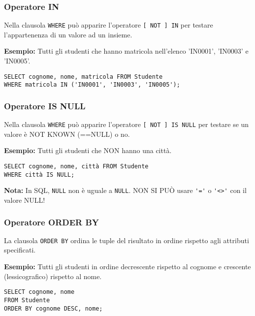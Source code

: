 \documentclass[a4paper, 10pt]{article}
\begin{document}
	\subsubsection{Operatore IN}
		Nella clausola \lstinline|WHERE| può apparire l’operatore \lstinline|[ NOT ] IN| per testare
		l’appartenenza di un valore ad un insieme.
	
		\noindent
		\textbf{Esempio: }Tutti gli studenti che hanno matricola nell’elenco 'IN0001', 'IN0003' e
		'IN0005'.
		\begin{lstlisting}
SELECT cognome, nome, matricola FROM Studente
WHERE matricola IN ('IN0001', 'IN0003', 'IN0005');
		\end{lstlisting}
	
	\subsubsection{Operatore IS NULL}
		Nella clausola \lstinline|WHERE| può apparire l’operatore \lstinline|[ NOT ] IS NULL| per testare
		se un valore è NOT KNOWN (==NULL) o no.
	
		\noindent
		\textbf{Esempio: }Tutti gli studenti che NON hanno una città.
\begin{lstlisting}
SELECT cognome, nome, città FROM Studente
WHERE città IS NULL;
\end{lstlisting}
	\textbf{Nota: }In SQL, \lstinline|NULL| non è uguale a \lstinline|NULL|.
	NON SI PUÒ usare \lstinline|'='| o \lstinline|'<>'| con il valore NULL!
	
	\subsubsection{Operatore ORDER BY}
		La clausola \lstinline|ORDER BY| ordina le tuple del risultato in ordine rispetto agli
		attributi specificati.
		
		\noindent
		\textbf{Esempio: }Tutti gli studenti in ordine decrescente rispetto al cognome e crescente
		(lessicografico) rispetto al nome.
		\begin{lstlisting}
SELECT cognome, nome
FROM Studente
ORDER BY cognome DESC, nome;
		\end{lstlisting}
		
\end{document}
